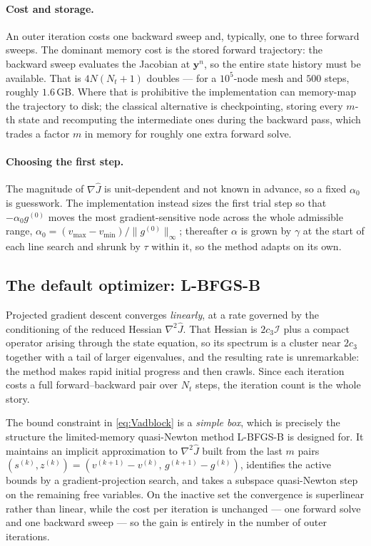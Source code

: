\documentclass[11pt]{article}
\begin{document}
\paragraph{Cost and storage.} An outer iteration costs one backward sweep and, typically, one to three forward sweeps. The dominant memory cost is the stored forward trajectory: the backward sweep evaluates the Jacobian at $\mathbf{y}^n$, so the entire state history must be available. That is $4N(N_t+1)$ doubles --- for a $10^5$-node mesh and $500$ steps, roughly $1.6\,$GB. Where that is prohibitive the implementation can memory-map the trajectory to disk; the classical alternative is checkpointing, storing every $m$-th state and recomputing the intermediate ones during the backward pass, which trades a factor $m$ in memory for roughly one extra forward solve.

\paragraph{Choosing the first step.} The magnitude of $\nabla\hat J$ is unit-dependent and not known in advance, so a fixed $\alpha_0$ is guesswork. The implementation instead sizes the first trial step so that $-\alpha_0 g^{(0)}$ moves the most gradient-sensitive node across the whole admissible range, $\alpha_0 = (v_{\max}-v_{\min})/\lVert g^{(0)}\rVert_\infty$; thereafter $\alpha$ is grown by $\gamma$ at the start of each line search and shrunk by $\tau$ within it, so the method adapts on its own.

\subsection{The default optimizer: L-BFGS-B}
\label{sec:lbfgs}

Projected gradient descent converges \emph{linearly}, at a rate governed by the conditioning of the reduced Hessian $\nabla^2\hat J$. That Hessian is $2c_3\mathcal{I}$ plus a compact operator arising through the state equation, so its spectrum is a cluster near $2c_3$ together with a tail of larger eigenvalues, and the resulting rate is unremarkable: the method makes rapid initial progress and then crawls. Since each iteration costs a full forward--backward pair over $N_t$ steps, the iteration count is the whole story.

The bound constraint in \eqref{eq:Vadblock} is a \emph{simple box}, which is precisely the structure the limited-memory quasi-Newton method L-BFGS-B is designed for. It maintains an implicit approximation to $\nabla^2\hat J$ built from the last $m$ pairs $(s^{(k)},z^{(k)}) = (v^{(k+1)}-v^{(k)},\,g^{(k+1)}-g^{(k)})$, identifies the active bounds by a gradient-projection search, and takes a subspace quasi-Newton step on the remaining free variables. On the inactive set the convergence is superlinear rather than linear, while the cost per iteration is unchanged --- one forward solve and one backward sweep --- so the gain is entirely in the number of outer iterations.
\end{document}
